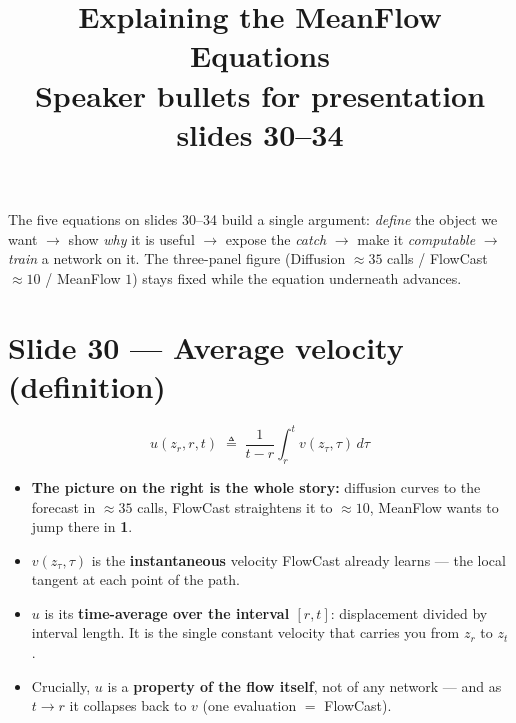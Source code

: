 \documentclass[11pt]{article}
\title{\textbf{Explaining the MeanFlow Equations}\\[2pt]
       \large Speaker bullets for presentation slides 30--34}
\author{}
\date{}
\begin{document}
\maketitle
\vspace{-2.5em}

\noindent The five equations on slides 30--34 build a single argument:
\emph{define} the object we want $\rightarrow$ show \emph{why} it is useful
$\rightarrow$ expose the \emph{catch} $\rightarrow$ make it \emph{computable}
$\rightarrow$ \emph{train} a network on it. The three-panel figure
(Diffusion $\approx 35$ calls / FlowCast $\approx 10$ / MeanFlow $1$) stays
fixed while the equation underneath advances.

\section*{Slide 30 --- Average velocity (definition)}
\begin{equation*}
  u(z_r, r, t) \;\triangleq\; \frac{1}{t - r} \int_{r}^{t} v(z_\tau, \tau)\, d\tau
\end{equation*}
\begin{itemize}
  \item \textbf{The picture on the right is the whole story:} diffusion
        curves to the forecast in $\approx 35$ calls, FlowCast straightens it
        to $\approx 10$, MeanFlow wants to jump there in \textbf{1}.
  \item $v(z_\tau, \tau)$ is the \textbf{instantaneous} velocity FlowCast
        already learns --- the local tangent at each point of the path.
  \item $u$ is its \textbf{time-average over the interval $[r, t]$}:
        displacement divided by interval length. It is the single constant
        velocity that carries you from $z_r$ to $z_t$.
  \item Crucially, $u$ is a \textbf{property of the flow itself}, not of any
        network --- and as $t \to r$ it collapses back to $v$
        (one evaluation $=$ FlowCast).
\end{itemize}

\end{document}

